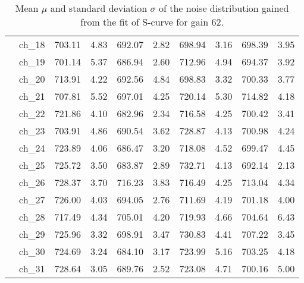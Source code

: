 \begin{table}[H]
{\begin{tabular}{|c|c|c|c|c|c|c|c|c|c|}
  &ch\_18 & 703.11 & 4.83 & 692.07 & 2.82 & 698.94 & 3.16 & 698.39 & 3.95 \\
  &ch\_19 & 701.14 & 5.37 & 686.94 & 2.60 & 712.96 & 4.94 & 694.37 & 3.92 \\
  &ch\_20 & 713.91 & 4.22 & 692.56 & 4.84 & 698.83 & 3.32 & 700.33 & 3.77 \\
  &ch\_21 & 707.81 & 5.52 & 697.01 & 4.25 & 720.14 & 5.30 & 714.82 & 4.18 \\
  &ch\_22 & 721.86 & 4.10 & 682.96 & 2.34 & 716.58 & 4.25 & 700.42 & 3.41 \\
  &ch\_23 & 703.91 & 4.86 & 690.54 & 3.62 & 728.87 & 4.13 & 700.98 & 4.24 \\
  &ch\_24 & 723.89 & 4.06 & 686.47 & 3.20 & 718.08 & 4.52 & 699.47 & 4.45 \\
  &ch\_25 & 725.72 & 3.50 & 683.87 & 2.89 & 732.71 & 4.13 & 692.14 & 2.13 \\
  &ch\_26 & 728.37 & 3.70 & 716.23 & 3.83 & 716.49 & 4.25 & 713.04 & 4.34 \\
  &ch\_27 & 726.00 & 4.03 & 694.05 & 2.76 & 711.69 & 4.19 & 701.18 & 4.00 \\
  &ch\_28 & 717.49 & 4.34 & 705.01 & 4.20 & 719.93 & 4.66 & 704.64 & 6.43 \\
  &ch\_29 & 725.96 & 3.32 & 698.91 & 3.47 & 730.83 & 4.41 & 707.22 & 3.45 \\
  &ch\_30 & 724.69 & 3.24 & 684.10 & 3.17 & 723.99 & 5.16 & 703.25 & 4.18 \\
  &ch\_31 & 728.64 & 3.05 & 689.76 & 2.52 & 723.08 & 4.71 & 700.16 & 5.00 \\
        
    \hline
        
    \end{tabular}
    }
    \caption{Mean $\mu$ and standard deviation $\sigma$ of the noise distribution gained from the fit of S-curve for gain 62.}
    \label{tab:noise_parameter_3}
\end{table}

